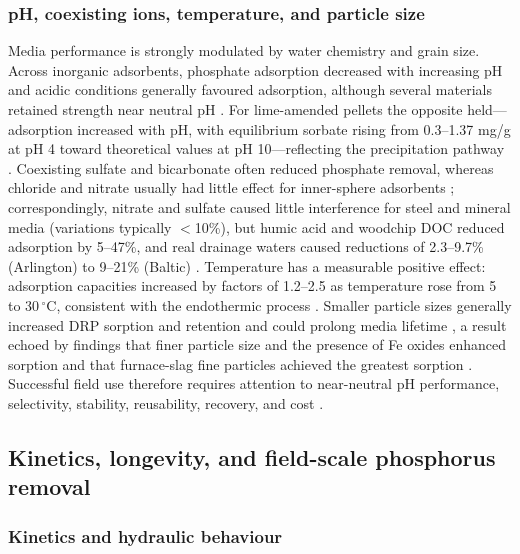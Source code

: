 \documentclass[11pt]{article}
\begin{document}
\subsubsection{pH, coexisting ions, temperature, and particle size}

Media performance is strongly modulated by water chemistry and grain size. Across inorganic adsorbents, phosphate adsorption decreased with increasing pH and acidic conditions generally favoured adsorption, although several materials retained strength near neutral pH \parencite{Li2020}. For lime-amended pellets the opposite held---adsorption increased with pH, with equilibrium sorbate rising from 0.3--1.37 mg/g at pH 4 toward theoretical values at pH 10---reflecting the precipitation pathway \parencite{Li2017}. Coexisting sulfate and bicarbonate often reduced phosphate removal, whereas chloride and nitrate usually had little effect for inner-sphere adsorbents \parencite{Li2020}; correspondingly, nitrate and sulfate caused little interference for steel and mineral media (variations typically $<$10\%), but humic acid and woodchip DOC reduced adsorption by 5--47\%, and real drainage waters caused reductions of 2.3--9.7\% (Arlington) to 9--21\% (Baltic) \parencite{Sellner2019b}. Temperature has a measurable positive effect: adsorption capacities increased by factors of 1.2--2.5 as temperature rose from 5 to 30\,$^{\circ}$C, consistent with the endothermic process \parencite{Sellner2019b}. Smaller particle sizes generally increased DRP sorption and retention and could prolong media lifetime \parencite{Mendes2022}, a result echoed by findings that finer particle size and the presence of Fe oxides enhanced sorption \parencite{Pugliese2023} and that furnace-slag fine particles achieved the greatest sorption \parencite{Sanford2016}. Successful field use therefore requires attention to near-neutral pH performance, selectivity, stability, reusability, recovery, and cost \parencite{Li2020}.

\subsection{Kinetics, longevity, and field-scale phosphorus removal}

\subsubsection{Kinetics and hydraulic behaviour}
\end{document}
